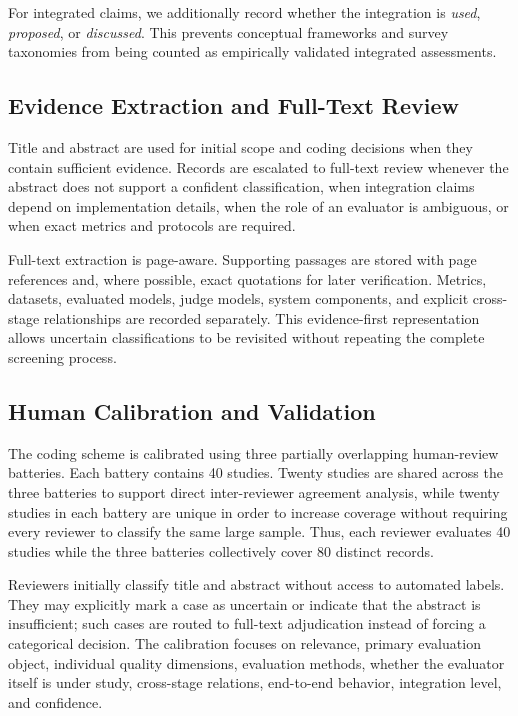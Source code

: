 For integrated claims, we additionally record whether the integration is \emph{used}, \emph{proposed}, or \emph{discussed}. This prevents conceptual frameworks and survey taxonomies from being counted as empirically validated integrated assessments.

\subsection{Evidence Extraction and Full-Text Review}

Title and abstract are used for initial scope and coding decisions when they contain sufficient evidence. Records are escalated to full-text review whenever the abstract does not support a confident classification, when integration claims depend on implementation details, when the role of an evaluator is ambiguous, or when exact metrics and protocols are required.

Full-text extraction is page-aware. Supporting passages are stored with page references and, where possible, exact quotations for later verification. Metrics, datasets, evaluated models, judge models, system components, and explicit cross-stage relationships are recorded separately. This evidence-first representation allows uncertain classifications to be revisited without repeating the complete screening process.

\subsection{Human Calibration and Validation}

The coding scheme is calibrated using three partially overlapping human-review batteries. Each battery contains 40 studies. Twenty studies are shared across the three batteries to support direct inter-reviewer agreement analysis, while twenty studies in each battery are unique in order to increase coverage without requiring every reviewer to classify the same large sample. Thus, each reviewer evaluates 40 studies while the three batteries collectively cover 80 distinct records.

Reviewers initially classify title and abstract without access to automated labels. They may explicitly mark a case as uncertain or indicate that the abstract is insufficient; such cases are routed to full-text adjudication instead of forcing a categorical decision. The calibration focuses on relevance, primary evaluation object, individual quality dimensions, evaluation methods, whether the evaluator itself is under study, cross-stage relations, end-to-end behavior, integration level, and confidence.

